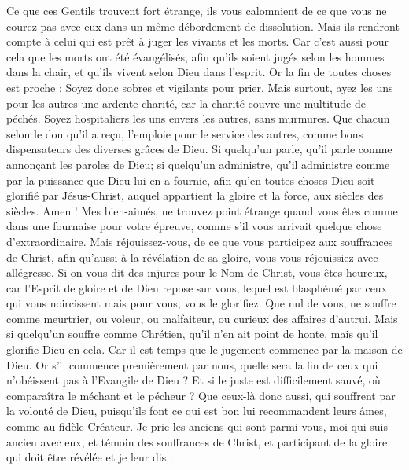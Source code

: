 \begin{multicols}{2}
Ce que ces Gentils trouvent fort étrange, ils vous calomnient de ce que vous ne courez pas avec eux dans un même débordement de dissolution. 
Mais ils rendront compte à celui qui est prêt à juger les vivants et les morts.
Car c'est aussi pour cela que les morts ont été évangélisés, afin qu'ils soient jugés selon les hommes dans la chair, et qu'ils vivent selon Dieu dans l'esprit. 
Or la fin de toutes choses est proche : Soyez donc sobres et vigilants pour prier. 
Mais surtout, ayez les uns pour les autres une ardente charité, car la charité couvre une multitude de péchés.
Soyez hospitaliers les uns envers les autres, sans murmures. 
Que chacun selon le don qu'il a reçu, l'emploie pour le service des autres, comme bons dispensateurs des diverses grâces de Dieu. 
 Si quelqu'un parle, qu'il parle comme annonçant les paroles de Dieu; si quelqu'un administre, qu'il administre comme par la puissance que Dieu lui en a fournie, afin qu'en toutes choses Dieu soit glorifié par Jésus-Christ, auquel appartient la gloire et la force, aux siècles des siècles. Amen ! 
Mes bien-aimés, ne trouvez point étrange quand vous êtes comme dans une fournaise pour votre épreuve, comme s'il vous arrivait quelque chose d'extraordinaire. 
Mais réjouissez-vous, de ce que vous participez aux souffrances de Christ, afin qu'aussi à la révélation de sa gloire, vous vous réjouissiez avec allégresse.
Si on vous dit des injures pour le Nom de Christ, vous êtes heureux, car l'Esprit de gloire et de Dieu repose sur vous, lequel est blasphémé par ceux qui vous noircissent mais pour vous, vous le glorifiez.
Que nul de vous, ne souffre comme meurtrier, ou voleur, ou malfaiteur, ou curieux des affaires d'autrui. 
Mais si quelqu'un souffre comme Chrétien, qu'il n'en ait point de honte, mais qu'il glorifie Dieu en cela.
Car il est temps que le jugement commence par la maison de Dieu. Or s'il commence premièrement par nous, quelle sera la fin de ceux qui n'obéissent pas à l'Evangile de Dieu ?
Et si le juste est difficilement sauvé, où comparaîtra le méchant et le pécheur ? 
Que ceux-là donc aussi, qui souffrent par la volonté de Dieu, puisqu'ils font ce qui est bon lui recommandent leurs âmes, comme au fidèle Créateur. 
\VerseOne{}Je prie les anciens qui sont parmi vous, moi qui suis ancien avec eux, et témoin des souffrances de Christ, et participant de la gloire qui doit être révélée et je leur dis : 

\end{multicols}
